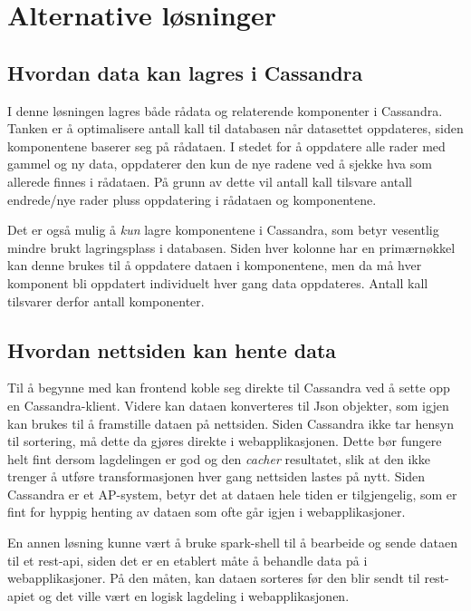 \section{Alternative løsninger}

\subsection{Hvordan data kan lagres i Cassandra}
I denne løsningen lagres både rådata og relaterende komponenter i Cassandra. Tanken er å optimalisere antall kall til databasen når datasettet oppdateres, siden komponentene baserer seg på rådataen. I stedet for å oppdatere alle rader med gammel og ny data, oppdaterer den kun de nye radene ved å sjekke hva som allerede finnes i rådataen. På grunn av dette vil antall kall tilsvare antall endrede/nye rader pluss oppdatering i rådataen og komponentene.

Det er også mulig å \textit{kun} lagre komponentene i Cassandra, som betyr vesentlig mindre brukt lagringsplass i databasen. Siden hver kolonne har en primærnøkkel kan denne brukes til å oppdatere dataen i komponentene, men da må hver komponent bli oppdatert individuelt hver gang data oppdateres. Antall kall tilsvarer derfor antall komponenter.

\subsection{Hvordan nettsiden kan hente data}
Til å begynne med kan frontend koble seg direkte til Cassandra ved å sette opp en Cassandra-klient. Videre kan dataen konverteres til Json objekter, som igjen kan brukes til å framstille dataen på nettsiden. Siden Cassandra ikke tar hensyn til sortering, må dette da gjøres direkte i webapplikasjonen. Dette bør fungere helt fint dersom lagdelingen er god og den \textit{cacher} resultatet, slik at den ikke trenger å utføre transformasjonen hver gang nettsiden lastes på nytt. Siden Cassandra er et AP-system, betyr det at dataen hele tiden er tilgjengelig, som er fint for hyppig henting av dataen som ofte går igjen i webapplikasjoner.

En annen løsning kunne vært å bruke spark-shell til å bearbeide og sende dataen til et rest-api, siden det er en etablert måte å behandle data på i webapplikasjoner. På den måten, kan dataen sorteres før den blir sendt til rest-apiet og det ville vært en logisk lagdeling i webapplikasjonen.
